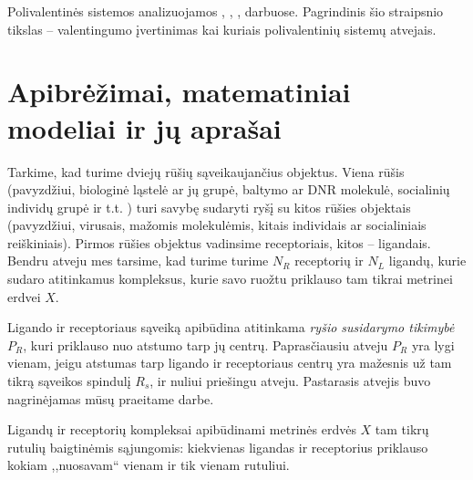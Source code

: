 \documentclass[10pt]{article}
\begin{document}
Polivalentinės  sistemos analizuojamos  \cite{Mammen98}, \cite{Chinlin2000}, \cite{Houseman02},\cite{Klein03} darbuose. Pagrindinis šio straipsnio tikslas -- valentingumo įvertinimas kai kuriais polivalentinių sistemų atvejais.

\section{Apibrėžimai, matematiniai modeliai ir jų aprašai}


Tarkime, kad turime dviejų rūšių sąveikaujančius objektus. Viena rūšis (pavyzdžiui, biologinė ląstelė ar jų grupė, baltymo ar DNR molekulė, socialinių individų grupė ir t.t. ) turi savybę sudaryti ryšį su kitos rūšies objektais (pavyzdžiui, virusais, mažomis molekulėmis, kitais individais ar socialiniais reiškiniais). Pirmos rūšies objektus vadinsime receptoriais, kitos -- ligandais. Bendru atveju mes tarsime, kad turime turime $N_R$ receptorių ir $N_L$ ligandų, kurie sudaro atitinkamus kompleksus, kurie savo ruožtu priklauso tam tikrai metrinei erdvei $X$.   

Ligando ir receptoriaus sąveiką apibūdina atitinkama \textit{ryšio susidarymo tikimybė} $P_R$, kuri priklauso nuo atstumo tarp jų centrų. Paprasčiausiu atveju $P_R$ yra lygi  vienam, jeigu atstumas tarp ligando ir receptoriaus centrų yra mažesnis už tam tikrą sąveikos spindulį $R_s$, ir nuliui priešingu atveju. Pastarasis atvejis buvo nagrinėjamas mūsų praeitame darbe. 

Ligandų ir receptorių kompleksai apibūdinami metrinės erdvės $X$ tam tikrų rutulių baigtinėmis sąjungomis: kiekvienas ligandas ir receptorius priklauso kokiam ,,nuosavam`` vienam ir tik vienam rutuliui.
\end{document}
